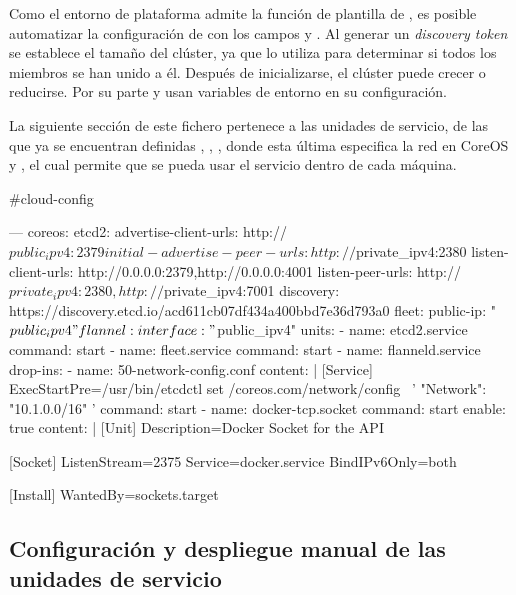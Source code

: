 Como el entorno de plataforma admite la función de plantilla de , es posible automatizar la configuración de  con los campos  y . Al generar un \textit{discovery token} se establece el tamaño del clúster, ya que  lo utiliza para determinar si todos los miembros se han unido a él. Después de inicializarse, el clúster puede crecer o reducirse. Por su parte  y  usan variables de entorno en su configuración.

La siguiente sección de este fichero pertenece a las unidades de servicio, de las que ya se encuentran definidas , , , donde esta última especifica la red en CoreOS y , el cual permite que se pueda usar el servicio  dentro de cada máquina.

\begin{codelisting}
\label{code:cloud-config1}
\begin{code}
#cloud-config

---
coreos:
  etcd2:
    advertise-client-urls: http://$public_ipv4:2379
    initial-advertise-peer-urls: http://$private_ipv4:2380
    listen-client-urls: http://0.0.0.0:2379,http://0.0.0.0:4001
    listen-peer-urls: http://$private_ipv4:2380,http://$private_ipv4:7001
    discovery: https://discovery.etcd.io/acd611cb07df434a400bbd7e36d793a0
  fleet:
    public-ip: "$public_ipv4"
  flannel:
    interface: "$public_ipv4"
  units:
  - name: etcd2.service
    command: start
  - name: fleet.service
    command: start
  - name: flanneld.service
    drop-ins:
    - name: 50-network-config.conf
      content: |
        [Service]
        ExecStartPre=/usr/bin/etcdctl set /coreos.com/network/config \
                     '{ "Network": "10.1.0.0/16" }'
    command: start
  - name: docker-tcp.socket
    command: start
    enable: true
    content: |
      [Unit]
      Description=Docker Socket for the API

      [Socket]
      ListenStream=2375
      Service=docker.service
      BindIPv6Only=both

      [Install]
      WantedBy=sockets.target
\end{code}
\end{codelisting}

\subsection{Configuración y despliegue manual de las unidades de servicio}


